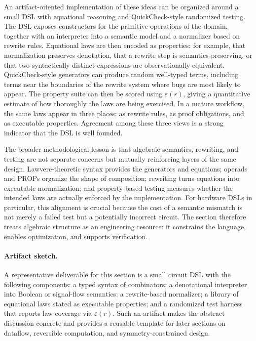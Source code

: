\documentclass[11pt]{article}
\begin{document}
An artifact-oriented implementation of these ideas can be organized around a small DSL with equational reasoning and QuickCheck-style randomized testing. The DSL exposes constructors for the primitive operations of the domain, together with an interpreter into a semantic model and a normalizer based on rewrite rules. Equational laws are then encoded as properties: for example, that normalization preserves denotation, that a rewrite step is semantics-preserving, or that two syntactically distinct expressions are observationally equivalent. QuickCheck-style generators can produce random well-typed terms, including terms near the boundaries of the rewrite system where bugs are most likely to appear. The property suite can then be scored using \(\varepsilon(r)\), giving a quantitative estimate of how thoroughly the laws are being exercised. In a mature workflow, the same laws appear in three places: as rewrite rules, as proof obligations, and as executable properties. Agreement among these three views is a strong indicator that the DSL is well founded.

The broader methodological lesson is that algebraic semantics, rewriting, and testing are not separate concerns but mutually reinforcing layers of the same design. Lawvere-theoretic syntax provides the generators and equations; operads and PROPs organize the shape of composition; rewriting turns equations into executable normalization; and property-based testing measures whether the intended laws are actually enforced by the implementation. For hardware DSLs in particular, this alignment is crucial because the cost of a semantic mismatch is not merely a failed test but a potentially incorrect circuit. The section therefore treats algebraic structure as an engineering resource: it constrains the language, enables optimization, and supports verification.

\paragraph{Artifact sketch.} A representative deliverable for this section is a small circuit DSL with the following components: a typed syntax of combinators; a denotational interpreter into Boolean or signal-flow semantics; a rewrite-based normalizer; a library of equational laws stated as executable properties; and a randomized test harness that reports law coverage via \(\varepsilon(r)\). Such an artifact makes the abstract discussion concrete and provides a reusable template for later sections on dataflow, reversible computation, and symmetry-constrained design.
\end{document}
